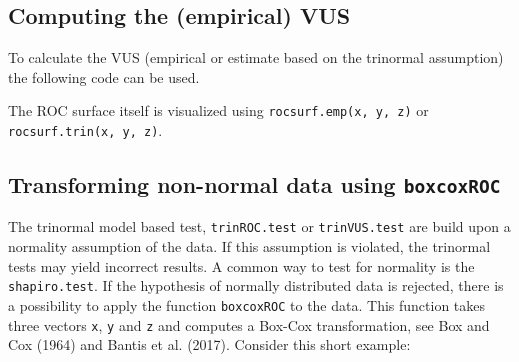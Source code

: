 \documentclass[
]{article}
\newenvironment{Shaded}{\begin{snugshade}}{\end{snugshade}}
\newcommand{\CommentTok}[1]{\textcolor[rgb]{0.56,0.35,0.01}{\textit{#1}}}
\newcommand{\DecValTok}[1]{\textcolor[rgb]{0.00,0.00,0.81}{#1}}
\newcommand{\FunctionTok}[1]{\textcolor[rgb]{0.00,0.00,0.00}{#1}}
\newcommand{\NormalTok}[1]{#1}
\newcommand{\OtherTok}[1]{\textcolor[rgb]{0.56,0.35,0.01}{#1}}
\newcommand{\SpecialCharTok}[1]{\textcolor[rgb]{0.00,0.00,0.00}{#1}}
\newcommand{\StringTok}[1]{\textcolor[rgb]{0.31,0.60,0.02}{#1}}
\begin{document}
\hypertarget{computing-the-empirical-vus}{%
\subsection{Computing the (empirical)
VUS}\label{computing-the-empirical-vus}}

To calculate the VUS (empirical or estimate based on the trinormal
assumption) the following code can be used.

\begin{Shaded}
\end{Shaded}

The ROC surface itself is visualized using
\texttt{rocsurf.emp(x,\ y,\ z)} or \texttt{rocsurf.trin(x,\ y,\ z)}.

\hypertarget{transforming-non-normal-data-using-boxcoxroc}{%
\subsection{\texorpdfstring{Transforming non-normal data using
\texttt{boxcoxROC}}{Transforming non-normal data using boxcoxROC}}\label{transforming-non-normal-data-using-boxcoxroc}}

The trinormal model based test, \texttt{trinROC.test} or
\texttt{trinVUS.test} are build upon a normality assumption of the data.
If this assumption is violated, the trinormal tests may yield incorrect
results. A common way to test for normality is the
\texttt{shapiro.test}. If the hypothesis of normally distributed data is
rejected, there is a possibility to apply the function
\texttt{boxcoxROC} to the data. This function takes three vectors
\texttt{x}, \texttt{y} and \texttt{z} and computes a Box-Cox
transformation, see Box and Cox (1964) and Bantis et al. (2017).
Consider this short example:
\end{document}
